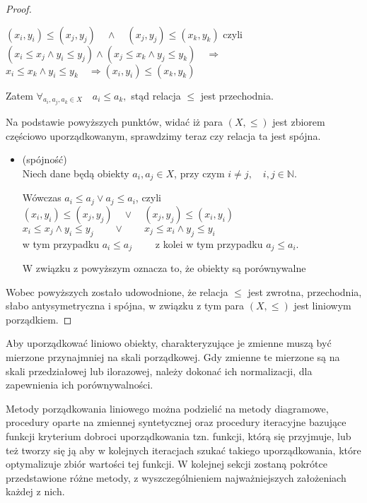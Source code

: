 \documentclass[12pt,a4paper]{report}
\begin{document}
\begin{proof}
\begin{itemize}
\begin{center}
$(x_i, y_i) \leq (x_j, y_j) \quad \wedge \quad  (x_j, y_j) \leq (x_k, y_k)$ czyli\\ 
$(x_i \leq x_j \wedge y_i \leq y_j) \wedge (x_j \leq x_k \wedge y_j \leq y_k) \quad \Rightarrow$\\
$x_i \leq x_k \wedge y_i \leq y_k \quad \Rightarrow (x_i,y_i) \leq (x_k,y_k)$\\
\end{center}
Zatem $\forall_{a_i, a_j, a_k \in X}\quad a_i \leq a_k,  $ stąd relacja $\leq$ jest przechodnia. 
\end{itemize}
Na podstawie powyższych punktów, widać iż para $(X,\leq)$ jest zbiorem częściowo uporządkowanym, sprawdzimy teraz czy relacja ta jest spójna.
\begin{itemize}
\item (spójność)\\
Niech dane będą obiekty $a_i, a_j \in X$, przy czym $i\neq j, \quad i,j \in \mathbb{N}$.\\
\begin{center}
Wówczas $a_i \leq a_j \vee a_j\leq a_i$, czyli\\
$(x_i,y_i)\leq (x_j,y_j) \quad \vee \quad (x_j,y_j) \leq (x_i, y_i)$\\
$x_i \leq x_j \wedge y_i \leq y_j \quad \quad \vee \quad \quad x_j\leq x_i \wedge y_j\leq y_i$\\
w tym przypadku $a_i \leq a_j \quad  \quad$ z kolei w tym przypadku $a_j \leq a_i.$
\end{center}
W związku z powyższym oznacza to, że obiekty są porównywalne
\end{itemize} 
Wobec powyższych zostało udowodnione, że relacja $\leq$ jest zwrotna, przechodnia, słabo antysymetryczna i spójna, w związku z tym para $(X, \leq)$ jest liniowym porządkiem.


\end{proof}




Aby uporządkować liniowo obiekty, charakteryzujące je zmienne muszą być mierzone przynajmniej na skali porządkowej. Gdy zmienne te mierzone są na skali przedziałowej lub ilorazowej, należy dokonać ich normalizacji, dla zapewnienia ich porównywalności.

Metody porządkowania liniowego można podzielić na metody diagramowe, procedury oparte na zmiennej syntetycznej oraz procedury iteracyjne bazujące funkcji kryterium dobroci uporządkowania tzn. funkcji, którą się przyjmuje, lub też tworzy się ją aby w kolejnych iteracjach szukać takiego uporządkowania, które optymalizuje zbiór wartości tej funkcji. W kolejnej sekcji zostaną pokrótce przedstawione różne metody, z wyszczególnieniem najważniejszych założeniach każdej z nich.
\end{document}
